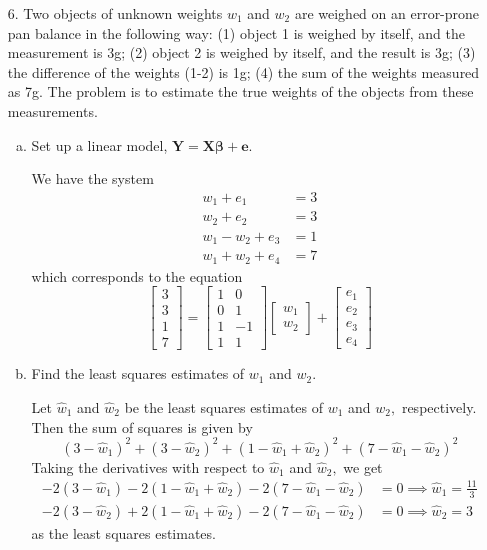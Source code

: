 \documentclass{article}
\begin{document}
\begin{itemize}
	\item[6.] Two objects of unknown weights $w_1$ and $w_2$ are weighed on an error-prone pan balance in the following way: (1) object 1 is weighed by itself, and the measurement is 3g; (2) object 2 is weighed by itself, and the result is 3g; (3) the difference of the weights (1-2) is 1g; (4) the sum of the weights measured as 7g. The problem is to estimate the true weights of the objects from these measurements.
		\begin{enumerate}[a.]
			\item Set up a linear model, $\mathbf{Y}=\mathbf{X}\mathbf{\beta}+\mathbf{e}.$
				\begin{soln}
					We have the system
					\begin{align*}
						w_1 + e_1 &= 3 \\
						w_2 + e_2 &= 3 \\
						w_1-w_2+e_3 &= 1 \\
						w_1+w_2+e_4 &= 7
					\end{align*}
					which corresponds to the equation 
					\[\begin{bmatrix}
							3 \\ 3 \\ 1 \\ 7
						\end{bmatrix} = \begin{bmatrix}
							1 & 0 \\ 0 & 1 \\ 1 & -1 \\ 1 & 1
						\end{bmatrix}\begin{bmatrix}
							w_1 \\ w_2
						\end{bmatrix} + \begin{bmatrix}
							e_1 \\ e_2 \\ e_3 \\ e_4
					\end{bmatrix}\]
				\end{soln}

			\item Find the least squares estimates of $w_1$ and $w_2.$
				\begin{soln}
					Let $\hat w_1$ and $\hat w_2$ be the least squares estimates of $w_1$ and $w_2,$ respectively. Then the sum of squares is given by
					\[(3-\hat w_1)^2 + (3-\hat w_2)^2 + (1-\hat w_1+\hat w_2)^2 + (7-\hat w_1-\hat w_2)^2\]
					Taking the derivatives with respect to $\hat w_1$ and $\hat w_2,$ we get
					\begin{align*}
						-2(3-\hat w_1) - 2(1-\hat w_1 + \hat w_2) - 2(7-\hat w_1-\hat w_2) &= 0 \implies \hat w_1 = \frac{11}{3} \\
						-2(3-\hat w_2) + 2(1-\hat w_1 + \hat w_2) - 2(7-\hat w_1-\hat w_2) &= 0 \implies \hat w_2 = 3
					\end{align*}
					as the least squares estimates.
				\end{soln}


\end{enumerate}
\end{itemize}
\end{document}
